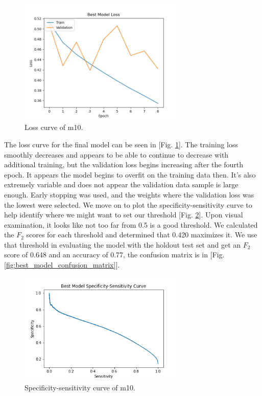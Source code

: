 \documentclass{article}
\begin{document}
\begin{figure}[]
    \centering
    \includegraphics[width=8cm]{best_model_loss}
    \caption{Loss curve of m10.}
    \label{fig:best_model_loss}
\end{figure}
    
    The loss curve for the final model can be seen in [Fig. \ref{fig:best_model_loss}]. The training loss smoothly decreases and appears to be able to continue to decrease with additional training, but the validation loss begins increasing after the fourth epoch. It appears the model begins to overfit on the training data then. It's also extremely variable and does not appear the validation data sample is large enough. Early stopping was used, and the weights where the validation loss was the lowest were selected. We move on to plot the specificity-sensitivity curve to help identify where we might want to set our threshold [Fig. \ref{fig:best_model_precision_recall}]. Upon visual examination, it looks like not too far from 0.5 is a good threshold. We calculated the $F_2$ scores for each threshold and determined that 0.420 maximizes it. We use that threshold in evaluating the model with the holdout test set and get an $F_2$ score of 0.648 and an accuracy of 0.77, the confusion matrix is in [Fig. \ref{fig:best_model_confusion_matrix}].
    
\begin{figure}[]
    \centering
    \includegraphics[width=8cm]{best_model_precision_recall}
    \caption{Specificity-sensitivity curve of m10.}
    \label{fig:best_model_precision_recall}
\end{figure}
\end{document}
